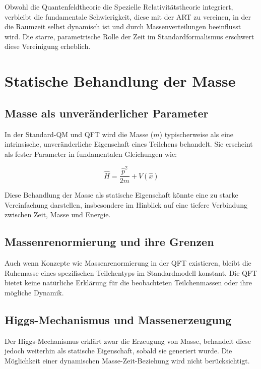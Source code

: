 \documentclass[12pt,a4paper]{article}  %
\begin{document}
	Obwohl die Quantenfeldtheorie die Spezielle Relativitätstheorie integriert, verbleibt die fundamentale Schwierigkeit, diese mit der ART zu vereinen, in der die Raumzeit selbst dynamisch ist und durch Massenverteilungen beeinflusst wird. Die starre, parametrische Rolle der Zeit im Standardformalismus erschwert diese Vereinigung erheblich.
	
	\section{Statische Behandlung der Masse}
	
	\subsection{Masse als unveränderlicher Parameter}
	
	In der Standard-QM und QFT wird die Masse ($m$) typischerweise als eine intrinsische, unveränderliche Eigenschaft eines Teilchens behandelt. Sie erscheint als fester Parameter in fundamentalen Gleichungen wie:
	
	\begin{equation}
		\hat{H} = \frac{\hat{p}^2}{2m} + V(\hat{x})
	\end{equation}
	
	Diese Behandlung der Masse als statische Eigenschaft könnte eine zu starke Vereinfachung darstellen, insbesondere im Hinblick auf eine tiefere Verbindung zwischen Zeit, Masse und Energie.
	
	\subsection{Massenrenormierung und ihre Grenzen}
	
	Auch wenn Konzepte wie Massenrenormierung in der QFT existieren, bleibt die Ruhemasse eines spezifischen Teilchentyps im Standardmodell konstant. Die QFT bietet keine natürliche Erklärung für die beobachteten Teilchenmassen oder ihre mögliche Dynamik.
	
	\subsection{Higgs-Mechanismus und Massenerzeugung}
	
	Der Higgs-Mechanismus erklärt zwar die Erzeugung von Masse, behandelt diese jedoch weiterhin als statische Eigenschaft, sobald sie generiert wurde. Die Möglichkeit einer dynamischen Masse-Zeit-Beziehung wird nicht berücksichtigt.
	
\end{document}
